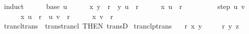 \begin{isabellebody}
\ induct\isanewline
\ \ \ \ \isamarkupfalse%
\ {\isacharparenleft}{\kern0pt}base\ u{\isacharparenright}{\kern0pt}\isanewline
\ \ \ \ \isamarkupfalse%
\ {\isacartoucheopen}{\isacharparenleft}{\kern0pt}x{\isacharcomma}{\kern0pt}\ y{\isacharparenright}{\kern0pt}\ {\isasymin}\ r\isactrlsup {\isacharplus}{\kern0pt}{\isacartoucheclose}\ \ {\isacartoucheopen}{\isacharparenleft}{\kern0pt}y{\isacharcomma}{\kern0pt}\ u{\isacharparenright}{\kern0pt}\ {\isasymin}\ r{\isacartoucheclose}\isanewline
\ \ \ \ \isamarkupfalse%
\ {\isachardoublequoteopen}{\isacharparenleft}{\kern0pt}x{\isacharcomma}{\kern0pt}\ u{\isacharparenright}{\kern0pt}\ {\isasymin}\ r\isactrlsup {\isacharplus}{\kern0pt}{\isachardoublequoteclose}\ \isacommand{{\isachardot}{\kern0pt}{\isachardot}{\kern0pt}}\isamarkupfalse%
\isanewline
\ \ \isamarkupfalse%
\isanewline
\ \ \ \ \isamarkupfalse%
\ {\isacharparenleft}{\kern0pt}step\ u\ v{\isacharparenright}{\kern0pt}\isanewline
\ \ \ \ \isamarkupfalse%
\ {\isacartoucheopen}{\isacharparenleft}{\kern0pt}x{\isacharcomma}{\kern0pt}\ u{\isacharparenright}{\kern0pt}\ {\isasymin}\ r\isactrlsup {\isacharplus}{\kern0pt}{\isacartoucheclose}\ \ {\isacartoucheopen}{\isacharparenleft}{\kern0pt}u{\isacharcomma}{\kern0pt}\ v{\isacharparenright}{\kern0pt}\ {\isasymin}\ r{\isacartoucheclose}\isanewline
\ \ \ \ \isamarkupfalse%
\ {\isachardoublequoteopen}{\isacharparenleft}{\kern0pt}x{\isacharcomma}{\kern0pt}\ v{\isacharparenright}{\kern0pt}\ {\isasymin}\ r\isactrlsup {\isacharplus}{\kern0pt}{\isachardoublequoteclose}\ \isacommand{{\isachardot}{\kern0pt}{\isachardot}{\kern0pt}}\isamarkupfalse%
\isanewline
\ \ \isamarkupfalse%
\isanewline
{}\isamarkupfalse%
%
\endisatagproof
{\isafoldproof}%
%
\isadelimproof
\isanewline
%
\endisadelimproof
\isanewline
{}\isamarkupfalse%
\ trancl{\isacharunderscore}{\kern0pt}trans\ {\isacharequal}{\kern0pt}\ trans{\isacharunderscore}{\kern0pt}trancl\ {\isacharbrackleft}{\kern0pt}THEN\ transD{\isacharbrackright}{\kern0pt}\isanewline
\isanewline
{}\isamarkupfalse%
\ tranclp{\isacharunderscore}{\kern0pt}trans{\isacharcolon}{\kern0pt}\isanewline
\ \ \ {\isachardoublequoteopen}r\isactrlsup {\isacharplus}{\kern0pt}\isactrlsup {\isacharplus}{\kern0pt}\ x\ y{\isachardoublequoteclose}\isanewline
\ \ \ \ \ {\isachardoublequoteopen}r\isactrlsup {\isacharplus}{\kern0pt}\isactrlsup {\isacharplus}{\kern0pt}\ y\ z{\isachardoublequoteclose}\isanewline

\end{isabellebody}
